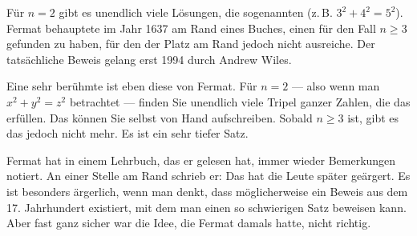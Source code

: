 \begin{math-stroke}

\begin{explanation-of-steps}
Für $n=2$ gibt es unendlich viele Lösungen, die sogenannten  (z.\,B. $3^2 + 4^2 = 5^2$). Fermat behauptete im Jahr 1637 am Rand eines Buches, einen  für den Fall $n \ge 3$ gefunden zu haben, für den der Platz am Rand jedoch nicht ausreiche. Der tatsächliche Beweis gelang erst 1994 durch Andrew Wiles.
\end{explanation-of-steps}
\end{math-stroke}

\begin{spoken-clean}[00:54:30 - 00:56:17]
Eine sehr berühmte ist eben diese von Fermat. Für $n=2$ --- also wenn man $x^2 + y^2 = z^2$ betrachtet --- finden Sie unendlich viele Tripel ganzer Zahlen, die das erfüllen. Das können Sie selbst von Hand aufschreiben. Sobald $n \ge 3$ ist, gibt es das jedoch nicht mehr. Es ist ein sehr tiefer Satz.

Fermat hat in einem Lehrbuch, das er gelesen hat, immer wieder Bemerkungen notiert. An einer Stelle am Rand schrieb er:  Das hat die Leute später geärgert. Es ist besonders ärgerlich, wenn man denkt, dass möglicherweise ein Beweis aus dem 17. Jahrhundert existiert, mit dem man einen so schwierigen Satz beweisen kann. Aber fast ganz sicher war die Idee, die Fermat damals hatte, nicht richtig.
\end{spoken-clean}

